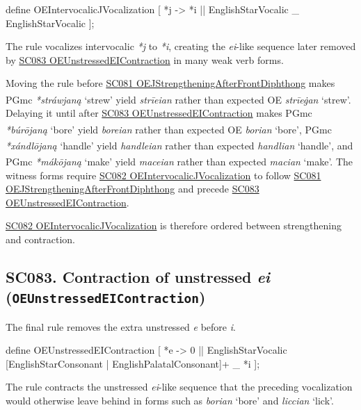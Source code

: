 \documentclass[
  british,
  a4paper,
  openany]{book}
\providecommand{\Pred}[1]{\textsuperscript{\dag}\emph{#1}}
\providecommand{\Recon}[1]{\emph{*#1}}
{\catcode`→=\active \global\def→{\ensuremath{\rightarrow}}}
\providecommand{\texorpdfstring}[2]{#1}
\providecommand{\Pred}[1]{\textsuperscript{\dag}\emph{#1}}
\providecommand{\Recon}[1]{\emph{*#1}}
{\catcode`→=\active \global\def→{\ensuremath{\rightarrow}}}
\begin{document}
\begin{ReaderFacingFoma}
define OEIntervocalicJVocalization [
    {*j} -> {*i} || EnglishStarVocalic _ EnglishStarVocalic
];
\end{ReaderFacingFoma}

The rule vocalizes intervocalic \emph{*j} to \emph{*i}, creating the
\emph{ei}-like sequence later removed by
\hyperref[rule-OEUnstressedEIContraction]{SC083
OEUnstressedEIContraction} in many weak verb forms.

Moving the rule before
\hyperref[rule-OEJStrengtheningAfterFrontDiphthong]{SC081
OEJStrengtheningAfterFrontDiphthong} makes PGmc \Recon{stráwjaną}
`strew' yield \Pred{strīeian} rather than expected OE \emph{strīeġan}
`strew'. Delaying it until after
\hyperref[rule-OEUnstressedEIContraction]{SC083
OEUnstressedEIContraction} makes PGmc \Recon{búrōjaną} `bore' yield
\Pred{boreian} rather than expected OE \emph{borian} `bore', PGmc
\Recon{xándlōjaną} `handle' yield \Pred{handleian} rather than expected
\emph{handlian} `handle', and PGmc \Recon{mákōjaną} `make' yield
\Pred{maceian} rather than expected \emph{macian} `make'. The witness
forms require \hyperref[rule-OEIntervocalicJVocalization]{SC082
OEIntervocalicJVocalization} to follow
\hyperref[rule-OEJStrengtheningAfterFrontDiphthong]{SC081
OEJStrengtheningAfterFrontDiphthong} and precede
\hyperref[rule-OEUnstressedEIContraction]{SC083
OEUnstressedEIContraction}.

\hyperref[rule-OEIntervocalicJVocalization]{SC082
OEIntervocalicJVocalization} is therefore ordered between strengthening
and contraction.

\subsection{\texorpdfstring{SC083. Contraction of unstressed \emph{ei}
(\texttt{OEUnstressedEIContraction})}{SC083. Contraction of unstressed  (OEUnstressedEIContraction)}}\label{rule-OEUnstressedEIContraction}

The final rule removes the extra unstressed \emph{e} before \emph{i}.

\begin{ReaderFacingFoma}
define OEUnstressedEIContraction [
    {*e} -> 0 || EnglishStarVocalic [EnglishStarConsonant | EnglishPalatalConsonant]+ _ {*i}
];
\end{ReaderFacingFoma}

The rule contracts the unstressed \emph{ei}-like sequence that the
preceding vocalization would otherwise leave behind in forms such as
\emph{borian} `bore' and \emph{liccian} `lick'.
\end{document}
